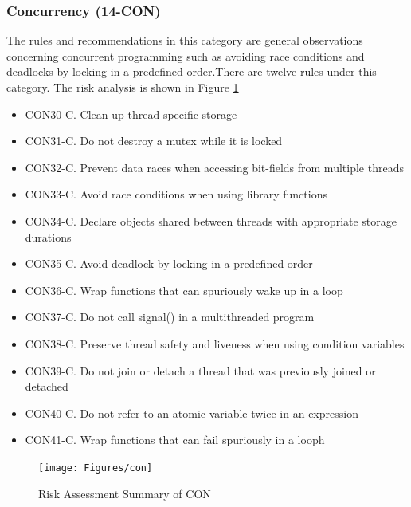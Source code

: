 			\subsubsection{Concurrency (14-CON)} The rules and recommendations in this category are general observations concerning concurrent programming such as avoiding race conditions and deadlocks by locking in a predefined order.There are twelve rules under this category. The risk analysis is shown in Figure \ref{fig:14}
			\begin{itemize}
				\item CON30-C. Clean up thread-specific storage
				
				\item CON31-C. Do not destroy a mutex while it is locked
				
				\item CON32-C. Prevent data races when accessing bit-fields from multiple threads
				
				\item CON33-C. Avoid race conditions when using library functions
				
				\item CON34-C. Declare objects shared between threads with appropriate storage durations
				
				\item CON35-C. Avoid deadlock by locking in a predefined order
				
				\item CON36-C. Wrap functions that can spuriously wake up in a loop
				
				\item CON37-C. Do not call signal() in a multithreaded program
				
				\item CON38-C. Preserve thread safety and liveness when using condition variables
				
				\item CON39-C. Do not join or detach a thread that was previously joined or detached
				
				\item CON40-C. Do not refer to an atomic variable twice in an expression
				
				\item CON41-C. Wrap functions that can fail spuriously in a looph
			\end{itemize}
			\begin{figure}[H]
				
				
				\centering
				\texttt{[image: Figures/con]}
				\caption{Risk Assessment Summary of CON}
				\label{fig:14}
				
			\end{figure}
